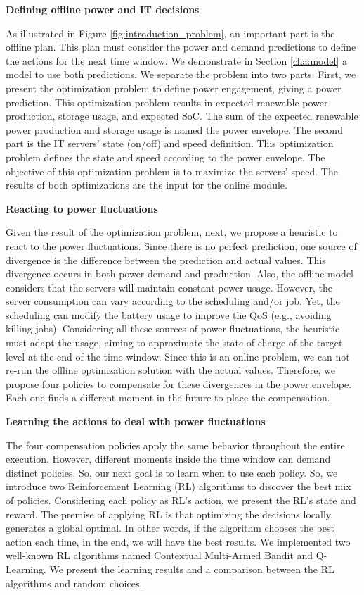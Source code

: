 \begin{center}
    \textbf{Defining offline power and IT decisions}
\end{center}
As illustrated in Figure \ref{fig:introduction_problem}, an important part is the offline plan. This plan must consider the power and demand predictions to define the actions for the next time window. We demonstrate in Section \ref{cha:model} a model to use both predictions. We separate the problem into two parts. First, we present the optimization problem to define power engagement, giving a power prediction. This optimization problem results in expected renewable power production, storage usage, and expected SoC. The sum of the expected renewable power production and storage usage is named the power envelope. The second part is the IT servers' state (on/off) and speed definition. This optimization problem defines the state and speed according to the power envelope. The objective of this optimization problem is to maximize the servers' speed. The results of both optimizations are the input for the online module.

\begin{center}
    \textbf{Reacting to power fluctuations}
\end{center}
Given the result of the optimization problem, next, we propose a heuristic to react to the power fluctuations. Since there is no perfect prediction, one source of divergence is the difference between the prediction and actual values. This divergence occurs in both power demand and production. Also, the offline model considers that the servers will maintain constant power usage. However, the server consumption can vary according to the scheduling and/or job. Yet, the scheduling can modify the battery usage to improve the QoS (e.g., avoiding killing jobs). Considering all these sources of power fluctuations, the heuristic must adapt the usage, aiming to approximate the state of charge of the target level at the end of the time window. Since this is an online problem, we can not re-run the offline optimization solution with the actual values. Therefore, we propose four policies to compensate for these divergences in the power envelope. Each one finds a different moment in the future to place the compensation. 

\begin{center}
    \textbf{Learning the actions to deal with power fluctuations}
\end{center}
The four compensation policies apply the same behavior throughout the entire execution. However, different moments inside the time window can demand distinct policies. So, our next goal is to learn when to use each policy. So, we introduce two Reinforcement Learning (RL) algorithms to discover the best mix of policies. Considering each policy as RL's action, we present the RL's state and reward. The premise of applying RL is that optimizing the decisions locally generates a global optimal. In other words, if the algorithm chooses the best action each time, in the end, we will have the best results. We implemented two well-known RL algorithms named Contextual Multi-Armed Bandit and Q-Learning. We present the learning results and a comparison between the RL algorithms and random choices. 

